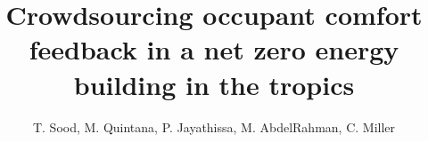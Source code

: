 \documentclass[a4paper]{jpconf} %
\begin{document}



\title{Crowdsourcing occupant comfort feedback in a net zero energy building in the tropics} 

\author{ T. Sood, M. Quintana,
P. Jayathissa, M. AbdelRahman, C. Miller}

\address{Building and Urban Data Science (BUDS) Group,  Department of Building, School of Design and Environment (SDE), National University of Singapore (NSU), Singapore}









\end{document}
